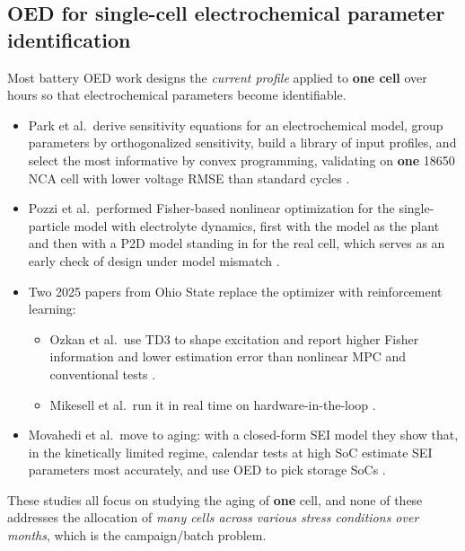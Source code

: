 \documentclass[11pt,letterpaper]{article}
\begin{document}
\subsection{OED for single-cell electrochemical parameter identification}
Most battery OED work designs the \emph{current profile} applied to \textbf{one cell} over hours so that electrochemical parameters become identifiable.
\begin{itemize}
    \item Park et al.\ derive sensitivity equations for an electrochemical model, group parameters by orthogonalized sensitivity, build a library of input profiles, and select the most informative by convex programming, validating on \textbf{one} 18650 NCA cell with lower voltage RMSE than standard cycles \cite{park2018}.
    \item Pozzi et al.\ performed Fisher-based nonlinear optimization for the single-particle model with electrolyte dynamics, first with the model as the plant and then with a P2D model standing in for the real cell, which serves as an early check of design under model mismatch \cite{pozzi2019}.
    \item Two 2025 papers from Ohio State replace the optimizer with reinforcement learning:
    \begin{itemize}
        \item Ozkan et al.\ use TD3 to shape excitation and report higher Fisher information and lower estimation error than nonlinear MPC and conventional tests \cite{ozkan2025}.
        \item Mikesell et al.\ run it in real time on hardware-in-the-loop \cite{mikesell2025}.
    \end{itemize}
    \item Movahedi et al.\ move to aging: with a closed-form SEI model they show that, in the kinetically limited regime, calendar tests at high SoC estimate SEI parameters most accurately, and use OED to pick storage SoCs \cite{movahedi2023}.
\end{itemize}
These studies all focus on studying the aging of \textbf{one} cell, and none of these addresses the allocation of \emph{many cells across various stress conditions over months}, which is the campaign/batch problem.
\end{document}
